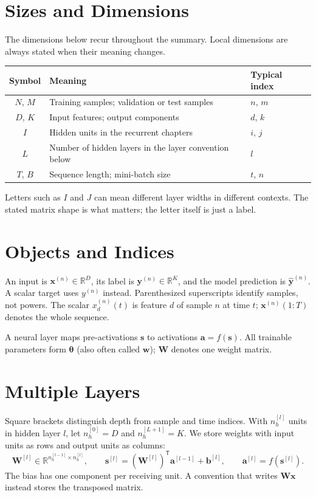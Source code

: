 \documentclass[11pt, oneside]{book}
\newcommand{\R}{\mathbb{R}}
\newcommand{\T}{^{\mathsf{T}}}           %
\newcommand{\params}{\boldsymbol{\theta}}   %
\let\originalsection\section
\renewcommand{\section}{\Needspace{7\baselineskip}\originalsection}
\begin{document}
\section{Sizes and Dimensions}\label{sec:source-0-2}
The dimensions below recur throughout the summary. Local dimensions are always stated when their meaning changes.
\begin{center}
\small
\begin{tabular}{@{}cll@{}}
\toprule
Symbol & Meaning & Typical index \\\midrule
$N$, $M$ & Training samples; validation or test samples & $n$, $m$ \\
$D$, $K$ & Input features; output components & $d$, $k$ \\
$I$ & Hidden units in the recurrent chapters & $i$, $j$ \\
$L$ & Number of hidden layers in the layer convention below & $l$ \\
$T$, $B$ & Sequence length; mini-batch size & $t$, $n$ \\\bottomrule
\end{tabular}
\end{center}
Letters such as $I$ and $J$ can mean different layer widths in different contexts. The stated matrix shape is what matters; the letter itself is just a label.

\section{Objects and Indices}\label{sec:source-0-3}
An input is $\mathbf{x}^{(n)}\in\R^D$, its label is $\mathbf{y}^{(n)}\in\R^K$, and the model prediction is $\widehat{\mathbf{y}}^{(n)}$. A scalar target uses $y^{(n)}$ instead. Parenthesized superscripts identify samples, not powers. The scalar $x_d^{(n)}(t)$ is feature $d$ of sample $n$ at time $t$; $\mathbf{x}^{(n)}(1\!:\!T)$ denotes the whole sequence.

A neural layer maps pre-activations $\mathbf{s}$ to activations $\mathbf{a}=f(\mathbf{s})$. All trainable parameters form $\params$ (also often called $\mathbf{w}$); $\mathbf{W}$ denotes one weight matrix.

\section{Multiple Layers}\label{sec:source-0-4}
Square brackets distinguish depth from sample and time indices. With $n_h^{[l]}$ units in hidden layer $l$, let $n_h^{[0]}=D$ and $n_h^{[L+1]}=K$. We store weights with input units as rows and output units as columns:
\[
 \mathbf{W}^{[l]}\in\R^{n_h^{[l-1]}\times n_h^{[l]}},\qquad
 \mathbf{s}^{[l]}=(\mathbf{W}^{[l]})\T\mathbf{a}^{[l-1]}+\mathbf{b}^{[l]},
 \qquad \mathbf{a}^{[l]}=f(\mathbf{s}^{[l]}).
\]
The bias has one component per receiving unit. A convention that writes $\mathbf{W}\mathbf{x}$ instead stores the transposed matrix.
\end{document}
